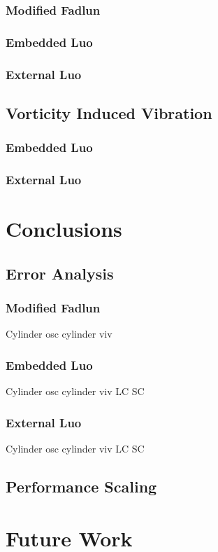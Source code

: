 \documentclass[onehalf,11pt]{beavtex}
\begin{document}
\subsection{Modified Fadlun}
\subsection{Embedded Luo}
\subsection{External Luo}
\section{Vorticity Induced Vibration}
\subsection{Embedded Luo}
\subsection{External Luo}

\chapter{Conclusions}
\section{Error Analysis}
\subsection{Modified Fadlun}
Cylinder
osc cylinder
viv
\subsection{Embedded Luo}
Cylinder
osc cylinder
viv
	LC
	SC
\subsection{External Luo}
Cylinder
osc cylinder
viv
	LC
	SC

\section{Performance Scaling}

\chapter{Future Work}
\end{document}
